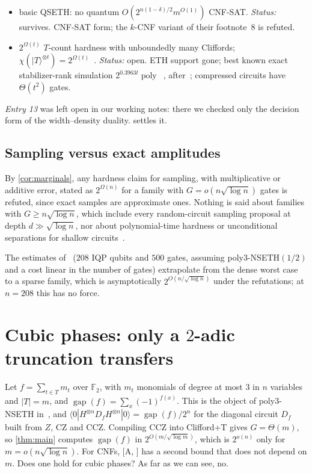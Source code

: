 \documentclass[10pt]{amsart}
\theoremstyle{plain}
\theoremstyle{definition}
\theoremstyle{remark}
\numberwithin{equation}{section}
\newcommand{\poly}{\operatorname{poly}}
\newcommand{\gap}{\operatorname{gap}}
\newcommand{\ket}[1]{|#1\rangle}
\newcommand{\amp}[3]{\langle #1|#2|#3\rangle}
\newcommand{\A}[1][]{\textup{[A\if\relax\detokenize{#1}\relax\else, #1\fi]}}
\begin{document}
{\begin{itemize}[leftmargin=2.2em,itemsep=2pt]
\item[23.] \cite{BPS19} basic QSETH: no quantum $O(2^{n(1-\delta)/2}m^{O(1)})$ CNF-SAT. \emph{Status:} survives. CNF-SAT form; the $k$-CNF variant of their footnote~8 is refuted.
\item[24.] $2^{\Omega(t)}$ $T$-count hardness with unboundedly many Cliffords; $\chi(\ket{T}^{\otimes t})=2^{\Omega(t)}$~\cite{BSS16}. \emph{Status:} open. ETH support gone; best known exact stabilizer-rank simulation $2^{0.3963t}\poly$~\cite{QPG21}, after~\cite{BSS16,BravyiGosset16}; compressed circuits have $\Theta(t^2)$ gates.
\end{itemize}
}

\emph{Entry 13} was left open in our working notes: there we checked only the decision form of the
width--density duality.  settles it.

\subsection{Sampling versus exact amplitudes}
By \cref{cor:marginals}, any hardness claim for sampling, with multiplicative or additive error,
stated as $2^{\Omega(n)}$ for a family with $G=o(n\sqrt{\log n})$ gates is refuted, since exact
samples are approximate ones. Nothing is said about families with $G\ge n\sqrt{\log n}$, which
include every random-circuit sampling proposal at depth $d\gg\sqrt{\log n}$, nor about
polynomial-time hardness or unconditional separations for shallow
circuits~\cite{TD04,BGK18}.

The estimates of~\cite{DHKL20} ($208$ IQP qubits and $500$ gates, assuming poly3-NSETH$(1/2)$ and a
cost linear in the number of gates) extrapolate from the dense worst case to a sparse family, which
is asymptotically $2^{O(n/\sqrt{\log n})}$ under the refutations; at $n=208$ this has no force.

\section{Cubic phases: only a \texorpdfstring{$2$}{2}-adic truncation transfers}\label{sec:cubic}

Let $f=\sum_{t\in T}m_t$ over $\mathbb F_2$, with $m_t$ monomials of degree at most $3$ in $n$
variables and $|T|=m$, and $\gap(f)=\sum_x(-1)^{f(x)}$. This is the object of poly3-NSETH
in~\cite{DHKL20}, and $\amp{0}{H^{\otimes n}D_fH^{\otimes n}}{0}=\gap(f)/2^n$ for the diagonal
circuit $D_f$ built from $Z$, $\mathrm{CZ}$ and $\mathrm{CCZ}$. Compiling $\mathrm{CCZ}$ into
Clifford+T gives $G=\Theta(m)$, so \cref{thm:main} computes $\gap(f)$ in $2^{O(m/\sqrt{\log m})}$,
which is $2^{o(n)}$ only for $m=o(n\sqrt{\log n})$. For CNFs, \A{} has a second bound that does
not depend on $m$. Does one hold for cubic phases? As far as we can see, no.
\end{document}
